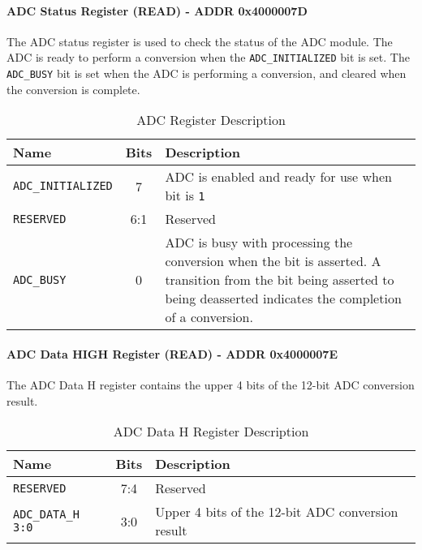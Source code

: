 \documentclass[main.tex]{subfiles}
\begin{document}
\paragraph{ADC Status Register (READ) - ADDR 0x4000007D}
The ADC status register is used to check the status of the ADC module. The ADC is ready to perform a conversion when the \texttt{ADC\_INITIALIZED} bit is set. The \texttt{ADC\_BUSY} bit is set when the ADC is performing a conversion, and cleared when the conversion is complete.
\begin{table}[H]
    \centering
    \begin{tabular}{|l|c|p{10cm}|}
        \hline
        \textbf{Name} & \textbf{Bits} & \textbf{Description} \\ \hline
        \texttt{ADC\_INITIALIZED} & 7 & ADC is enabled and ready for use when bit is \texttt{1} \\ \hline
        \texttt{RESERVED} & 6:1 & Reserved \\ \hline
        \texttt{ADC\_BUSY} & 0 & ADC is busy with processing the conversion when the bit is asserted. A transition from the bit being asserted to being deasserted indicates the completion of a conversion. \\ \hline
    \end{tabular}
    \caption{ADC Register Description}
    \label{tab:adc_status_register}
\end{table}

\paragraph{ADC Data HIGH Register (READ) - ADDR 0x4000007E}
The ADC Data H register contains the upper 4 bits of the 12-bit ADC conversion result.
\begin{table}[H]
    \centering
    \begin{tabular}{|l|c|p{10cm}|}
        \hline
        \textbf{Name} & \textbf{Bits} & \textbf{Description} \\ \hline
        \texttt{RESERVED} & 7:4 & Reserved \\ \hline
        \texttt{ADC\_DATA\_H 3:0} & 3:0 & Upper 4 bits of the 12-bit ADC conversion result \\ \hline
    \end{tabular}
    \caption{ADC Data H Register Description}
    \label{tab:adc_data_h_register}
\end{table}
\end{document}

